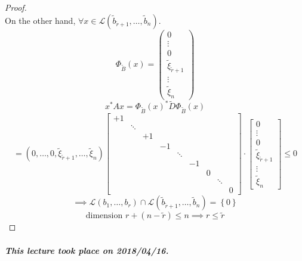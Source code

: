 \documentclass{article}
\newcommand{\set}[1]{\left\{#1\right\}}
\newcommand{\dateref}[1]{\paragraph{\textit{This lecture took place on #1.}}}
\begin{document}
\begin{proof}
\[  \]
  On the other hand, $\forall x \in \mathcal L(\tilde b_{\tilde r + 1}, \dots, \tilde b_n)$.
  \[
    \Phi_{\tilde B}(x) =
      \begin{pmatrix}
        0 \\ \vdots \\ 0 \\
        \tilde \xi_{\tilde r+1} \\
        \vdots \\ \tilde \xi_n
      \end{pmatrix}
  \] \[
    x^* Ax = \Phi_{\tilde B}(x)^* \tilde D \Phi_{\tilde B}(x)
  \] \[
    = (0, \dots, 0, \tilde \xi_{\tilde r + 1}, \dots, \tilde \xi_n)
    \begin{bmatrix}
       +1 &        &       &    &        &    &   &        & \\
          & \ddots &       &    &        &    &   &        & \\
          &        &    +1 &    &        &    &   &        & \\
          &        &       & -1 &        &    &   &        & \\
          &        &       &    & \ddots &    &   &        & \\
          &        &       &    &        & -1 &   &        & \\
          &        &       &    &        &    & 0 &        & \\
          &        &       &    &        &    &   & \ddots & \\
          &        &       &    &        &    &   &        & 0
    \end{bmatrix} \cdot \begin{bmatrix}
      0 \\ \vdots \\ 0 \\ \tilde \xi_{\tilde r+1} \\ \vdots \\ \tilde \xi_n
    \end{bmatrix} \leq 0
  \] \[
    \implies \mathcal L(b_1, \dots, b_r) \cap \mathcal L(\tilde b_{\tilde r+1}, \dots, \tilde b_n) = \set{0}
  \] \[
    \text{dimension } r + (n - \tilde r) \leq n \implies r \leq \tilde r
  \]
\end{proof}

\dateref{2018/04/16}
\end{document}
